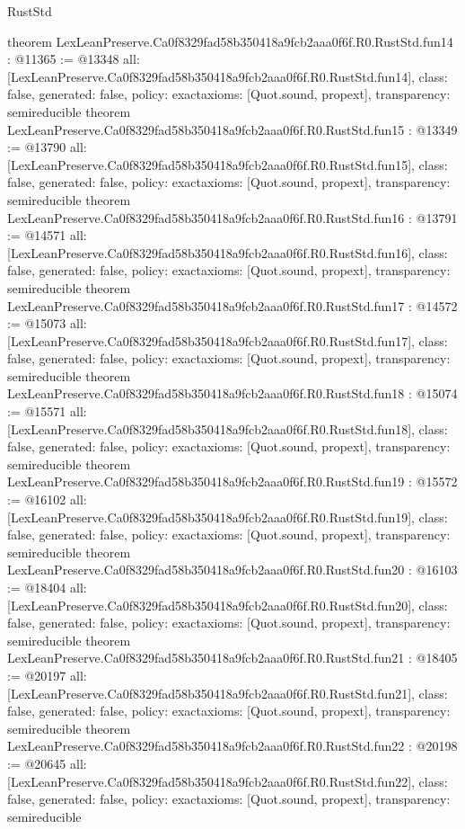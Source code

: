 \begin{lexlean}{RustStd}
\begin{coremodule}
{}
theorem LexLeanPreserve.Ca0f8329fad58b350418a9fcb2aaa0f6f.R0.RustStd.fun14 : @11365 := @13348 {
  all: [LexLeanPreserve.Ca0f8329fad58b350418a9fcb2aaa0f6f.R0.RustStd.fun14],
  class: false,
  generated: false,
  policy: exact{axioms: [Quot.sound, propext]},
  transparency: semireducible
}
theorem LexLeanPreserve.Ca0f8329fad58b350418a9fcb2aaa0f6f.R0.RustStd.fun15 : @13349 := @13790 {
  all: [LexLeanPreserve.Ca0f8329fad58b350418a9fcb2aaa0f6f.R0.RustStd.fun15],
  class: false,
  generated: false,
  policy: exact{axioms: [Quot.sound, propext]},
  transparency: semireducible
}
theorem LexLeanPreserve.Ca0f8329fad58b350418a9fcb2aaa0f6f.R0.RustStd.fun16 : @13791 := @14571 {
  all: [LexLeanPreserve.Ca0f8329fad58b350418a9fcb2aaa0f6f.R0.RustStd.fun16],
  class: false,
  generated: false,
  policy: exact{axioms: [Quot.sound, propext]},
  transparency: semireducible
}
theorem LexLeanPreserve.Ca0f8329fad58b350418a9fcb2aaa0f6f.R0.RustStd.fun17 : @14572 := @15073 {
  all: [LexLeanPreserve.Ca0f8329fad58b350418a9fcb2aaa0f6f.R0.RustStd.fun17],
  class: false,
  generated: false,
  policy: exact{axioms: [Quot.sound, propext]},
  transparency: semireducible
}
theorem LexLeanPreserve.Ca0f8329fad58b350418a9fcb2aaa0f6f.R0.RustStd.fun18 : @15074 := @15571 {
  all: [LexLeanPreserve.Ca0f8329fad58b350418a9fcb2aaa0f6f.R0.RustStd.fun18],
  class: false,
  generated: false,
  policy: exact{axioms: [Quot.sound, propext]},
  transparency: semireducible
}
theorem LexLeanPreserve.Ca0f8329fad58b350418a9fcb2aaa0f6f.R0.RustStd.fun19 : @15572 := @16102 {
  all: [LexLeanPreserve.Ca0f8329fad58b350418a9fcb2aaa0f6f.R0.RustStd.fun19],
  class: false,
  generated: false,
  policy: exact{axioms: [Quot.sound, propext]},
  transparency: semireducible
}
theorem LexLeanPreserve.Ca0f8329fad58b350418a9fcb2aaa0f6f.R0.RustStd.fun20 : @16103 := @18404 {
  all: [LexLeanPreserve.Ca0f8329fad58b350418a9fcb2aaa0f6f.R0.RustStd.fun20],
  class: false,
  generated: false,
  policy: exact{axioms: [Quot.sound, propext]},
  transparency: semireducible
}
theorem LexLeanPreserve.Ca0f8329fad58b350418a9fcb2aaa0f6f.R0.RustStd.fun21 : @18405 := @20197 {
  all: [LexLeanPreserve.Ca0f8329fad58b350418a9fcb2aaa0f6f.R0.RustStd.fun21],
  class: false,
  generated: false,
  policy: exact{axioms: [Quot.sound, propext]},
  transparency: semireducible
}
theorem LexLeanPreserve.Ca0f8329fad58b350418a9fcb2aaa0f6f.R0.RustStd.fun22 : @20198 := @20645 {
  all: [LexLeanPreserve.Ca0f8329fad58b350418a9fcb2aaa0f6f.R0.RustStd.fun22],
  class: false,
  generated: false,
  policy: exact{axioms: [Quot.sound, propext]},
  transparency: semireducible
}
\end{coremodule}
\end{lexlean}
